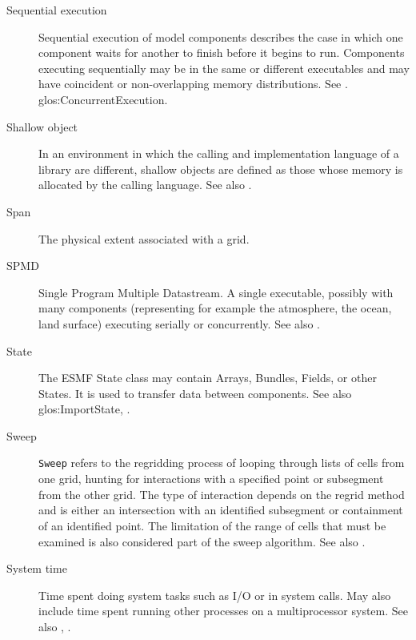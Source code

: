 \begin{description}
\label{glos:SequentialExecution}
\item[Sequential execution] 
  Sequential execution of model components describes the case in which 
  one component waits for another to finish before it begins
  to run.  Components executing sequentially may be in the same or 
  different executables and may have coincident or non-overlapping 
  memory distributions.  See .
  {glos:ConcurrentExecution}.

\label{glos:ShallowObjects} 
\item[Shallow object] 
  In an environment
  in which the calling and implementation language of a library are
  different, shallow objects are defined as those whose memory is 
  allocated by the calling language. 
  See also .

\label{glos:Span} 
\item[Span] 
  The physical extent associated with a grid.

\label{glos:SPMD} 
\item[SPMD] 
  Single Program Multiple Datastream. 
  A single executable, possibly with many components (representing 
  for example the atmosphere, the ocean, land surface) executing 
  serially or concurrently. See also . 

\label{glos:State} 
\item [State] 
  The ESMF State class may 
  contain Arrays, Bundles, Fields, or other States.  It is used to 
  transfer data between components.  See also 
  {glos:ImportState}, .

\label{glos:Sweep} 
\item[Sweep]
  {\tt Sweep} refers to the regridding process of looping through lists of cells
  from one grid, hunting for interactions with a specified point or subsegment
  from the other grid.  The type of interaction depends on the regrid method
  and is either an intersection with an identified subsegment or containment
  of an identified point.  The limitation of the range of cells that must be
  examined is also considered part of the sweep algorithm.
  See also .

\label{glos:SysTime} 
\item [System time] 
  Time spent doing system tasks 
  such as I/O or in system calls.  May also include time spent running 
  other processes on a multiprocessor system. See also , .


\end{description}
